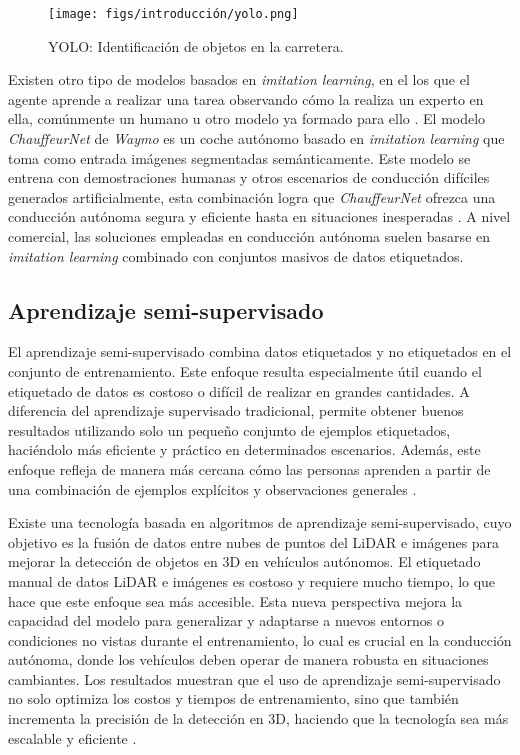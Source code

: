 \begin{figure}[ht]
\begin{center}
\texttt{[image: figs/introducción/yolo.png]}
\end{center}
\caption{\ac{YOLO}: Identificación de objetos en la carretera.}
\label{fig:yolo}
\end{figure}

Existen otro tipo de modelos basados en \textit{imitation learning}, en el los que el agente aprende a realizar una tarea observando cómo la realiza un experto en ella, comúnmente un humano u otro modelo ya formado para ello \cite{imitation-learning}. El modelo \textit{ChauffeurNet} de \textit{Waymo} es un coche autónomo basado en \textit{imitation learning} que toma como entrada imágenes segmentadas semánticamente. Este modelo se entrena con demostraciones humanas y otros escenarios de conducción difíciles generados artificialmente, esta combinación logra que \textit{ChauffeurNet} ofrezca una conducción autónoma segura y eficiente hasta en situaciones inesperadas \cite{chauffeurnet-paper}. A nivel comercial, las soluciones empleadas en conducción autónoma suelen basarse en \textit{imitation learning} combinado con conjuntos masivos de datos etiquetados.

\subsection{Aprendizaje semi-supervisado}

El aprendizaje semi-supervisado combina datos etiquetados y no etiquetados en el conjunto de entrenamiento. Este enfoque resulta especialmente útil cuando el etiquetado de datos es costoso o difícil de realizar en grandes cantidades. A diferencia del aprendizaje supervisado tradicional, permite obtener buenos resultados utilizando solo un pequeño conjunto de ejemplos etiquetados, haciéndolo más eficiente y práctico en determinados escenarios. Además, este enfoque refleja de manera más cercana cómo las personas aprenden a partir de una combinación de ejemplos explícitos y observaciones generales \cite{semi}.

Existe una tecnología basada en algoritmos de aprendizaje semi-supervisado, cuyo objetivo es la fusión de datos entre nubes de puntos del \ac{LiDAR} e imágenes para mejorar la detección de objetos en 3D en vehículos autónomos. El etiquetado manual de datos \ac{LiDAR} e imágenes es costoso y requiere mucho tiempo, lo que hace que este enfoque sea más accesible. Esta nueva perspectiva mejora la capacidad del modelo para generalizar y adaptarse a nuevos entornos o condiciones no vistas durante el entrenamiento, lo cual es crucial en la conducción autónoma, donde los vehículos deben operar de manera robusta en situaciones cambiantes. Los resultados muestran que el uso de aprendizaje semi-supervisado no solo optimiza los costos y tiempos de entrenamiento, sino que también incrementa la precisión de la detección en 3D, haciendo que la tecnología sea más escalable y eficiente \cite{semi-ex}.

